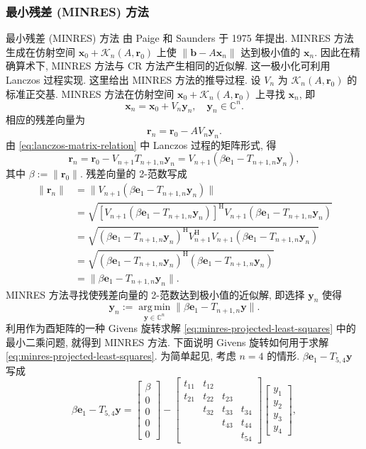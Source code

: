 \subsubsection{{最小残差 (MINRES) 方法}}\label{subsec:minres}
{最小残差 (MINRES) 方法  由 Paige 和 Saunders 于 1975 年提出. MINRES 方法生成在仿射空间 $\bm x_0+\mathcal K_n(A,\bm r_0)$ 上使 $\|\bm b-A\bm x_n\|$ 达到极小值的 $\bm x_n$. 因此在精确算术下, MINRES 方法与 CR 方法产生相同的近似解. 这一极小化可利用 Lanczos 过程实现.}
{这里给出 MINRES 方法的推导过程. 设 $V_n$ 为 $\mathcal K_n(A,\bm r_0)$ 的标准正交基. MINRES 方法在仿射空间 $\bm x_0+\mathcal K_n(A,\bm r_0)$ 上寻找 $\bm x_n$, 即}
\begin{equation}\label{eq:minres-affine-solution}\bm x_n=\bm x_0+V_n\bm y_n,\quad\bm y_n\in\mathbb C^n.\end{equation}
{相应的残差向量为}
\[\bm r_n=\bm r_0-AV_n\bm y_n.\]
{由 \eqref{eq:lanczos-matrix-relation} 中 Lanczos 过程的矩阵形式, 得}
\[\bm r_n=\bm r_0-V_{n+1}T_{n+1,n}\bm y_n=V_{n+1}(\beta\bm e_1-T_{n+1,n}\bm y_n),\]
{其中 $\beta:=\|\bm r_0\|$. 残差向量的 2-范数写成}
\[\begin{aligned}
\|\bm r_n\|&=\|V_{n+1}(\beta\bm e_1-T_{n+1,n}\bm y_n)\|\\
&=\sqrt{[V_{n+1}(\beta\bm e_1-T_{n+1,n}\bm y_n)]^{\mathrm H}V_{n+1}(\beta\bm e_1-T_{n+1,n}\bm y_n)}\\
&=\sqrt{(\beta\bm e_1-T_{n+1,n}\bm y_n)^{\mathrm H}V_{n+1}^{\mathrm H}V_{n+1}(\beta\bm e_1-T_{n+1,n}\bm y_n)}\\
&=\sqrt{(\beta\bm e_1-T_{n+1,n}\bm y_n)^{\mathrm H}(\beta\bm e_1-T_{n+1,n}\bm y_n)}\\
&=\|\beta\bm e_1-T_{n+1,n}\bm y_n\|.
\end{aligned}\]
{MINRES 方法寻找使残差向量的 2-范数达到极小值的近似解, 即选择 $\bm y_n$ 使得}
\begin{equation}\label{eq:minres-projected-least-squares}\bm y_n:=\operatorname*{arg\,min}_{\bm y\in\mathbb C^n}\|\beta\bm e_1-T_{n+1,n}\bm y\|.\end{equation}
{利用作为酉矩阵的一种 Givens 旋转求解 \eqref{eq:minres-projected-least-squares} 中的最小二乘问题, 就得到 MINRES 方法. 下面说明 Givens 旋转如何用于求解 \eqref{eq:minres-projected-least-squares}. 为简单起见, 考虑 $n=4$ 的情形. $\beta\bm e_1-T_{5,4}\bm y$ 写成}
\[\beta\bm e_1-T_{5,4}\bm y=\begin{bmatrix}\beta\\0\\0\\0\\0\end{bmatrix}
-\begin{bmatrix}t_{11}&t_{12}&&\\t_{21}&t_{22}&t_{23}&\\&t_{32}&t_{33}&t_{34}\\&&t_{43}&t_{44}\\&&&t_{54}\end{bmatrix}\begin{bmatrix}y_1\\y_2\\y_3\\y_4\end{bmatrix},\]

